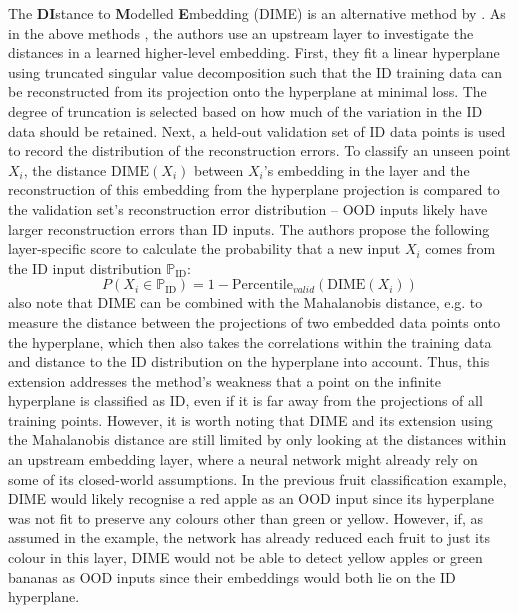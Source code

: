 \newpar The \textbf{DI}stance to \textbf{M}odelled \textbf{E}mbedding (DIME) is an alternative method by \textcite{dime-detector-2021}. As in the above methods \cite{ood-adversarial-detection-2018, ood-class-2022}, the authors use an upstream layer to investigate the distances in a learned higher-level embedding. First, they fit a linear hyperplane using truncated singular value decomposition such that the ID training data can be reconstructed from its projection onto the hyperplane at minimal loss. The degree of truncation is selected based on how much of the variation in the ID data should be retained. Next, a held-out validation set of ID data points is used to record the distribution of the reconstruction errors. To classify an unseen point $X_i$, the distance $\text{DIME}(X_i)$ between $X_i$'s embedding in the layer and the reconstruction of this embedding from the hyperplane projection is compared to the validation set's reconstruction error distribution -- OOD inputs likely have larger reconstruction errors than ID inputs. The authors propose the following layer-specific score to calculate the probability that a new input $X_i$ comes from the ID input distribution $\mathbb{P}_{\text{ID}}$:
\begin{equation} \label{eq:dime-id-percentile}
    P(X_i \in \mathbb{P}_{\text{ID}}) = 1 - \text{Percentile}_{valid}(\text{DIME}(X_i))
\end{equation}
\citeauthor{dime-detector-2021} also note that DIME can be combined with the Mahalanobis distance, e.g. to measure the distance between the projections of two embedded data points onto the hyperplane, which then also takes the correlations within the training data and distance to the ID distribution on the hyperplane into account. Thus, this extension addresses the method's weakness that a point on the infinite hyperplane is classified as ID, even if it is far away from the projections of all training points. However, it is worth noting that DIME and its extension using the Mahalanobis distance are still limited by only looking at the distances within an upstream embedding layer, where a neural network might already rely on some of its closed-world assumptions. In the previous fruit classification example, DIME would likely recognise a red apple as an OOD input since its hyperplane was not fit to preserve any colours other than green or yellow. However, if, as assumed in the example, the network has already reduced each fruit to just its colour in this layer, DIME would not be able to detect yellow apples or green bananas as OOD inputs since their embeddings would both lie on the ID hyperplane.

